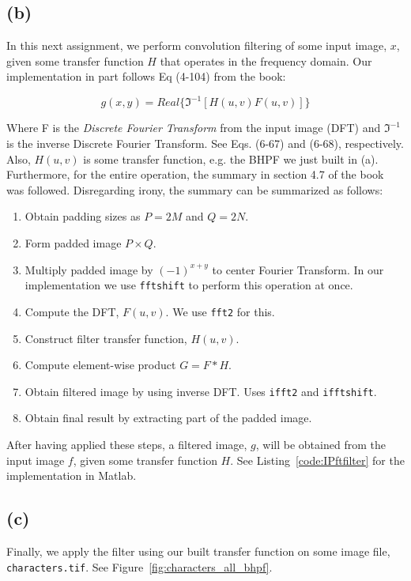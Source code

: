 \documentclass{article}
\begin{document}
\subsection*{(b)} In this next assignment, we perform convolution filtering of some input image, $x$, given some transfer function $H$ that operates in the frequency domain. Our implementation in part follows Eq (4-104) from the book:

\[
g(x, y) = Real\{\Im^{-1}[H(u,v)F(u, v)]\}
\]

Where F is the \textit{Discrete Fourier Transform} from the input image (DFT) and $\Im^{-1}$ is the inverse Discrete Fourier Transform. See Eqs. (6-67) and (6-68), respectively. Also, $H(u, v)$ is some transfer function, e.g. the BHPF we just built in (a). Furthermore, for the entire operation, the summary in section 4.7 of the book was followed. Disregarding irony, the summary can be summarized as follows:

\begin{enumerate}
    \item Obtain padding sizes as $P = 2M$ and $Q = 2N$.
    \item Form padded image $P \times Q$.
    \item Multiply padded image by $(-1)^{x+y}$ to center Fourier Transform. In our implementation we use \texttt{fftshift} to perform this operation at once.
    \item Compute the DFT, $F(u, v)$. We use \texttt{fft2} for this.
    \item Construct filter transfer function, $H(u, v)$.
    \item Compute element-wise product $G = F * H$.
    \item Obtain filtered image by using inverse DFT. Uses \texttt{ifft2} and \texttt{ifftshift}.
    \item Obtain final result by extracting part of the padded image.
\end{enumerate}

After having applied these steps, a filtered image, $g$, will be obtained from the input image $f$, given some transfer function $H$. See  Listing~\ref{code:IPftfilter} for the implementation in Matlab.

\subsection*{(c)} Finally, we apply the filter using our built transfer function on some image file, \texttt{characters.tif}. See Figure~\ref{fig:characters_all_bhpf}.
\end{document}
